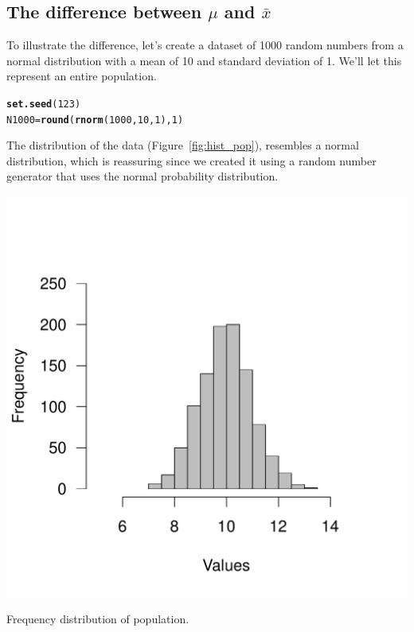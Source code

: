 \documentclass{tufte-handout}\usepackage[]{graphicx}\usepackage[]{color}
\makeatletter
\def\maxwidth{ %
  \ifdim\Gin@nat@width>\linewidth
    \linewidth
  \else
    \Gin@nat@width
  \fi
}
\newcommand{\hlnum}[1]{\textcolor[rgb]{0.686,0.059,0.569}{#1}}%
\newcommand{\hlstd}[1]{\textcolor[rgb]{0.345,0.345,0.345}{#1}}%
\newcommand{\hlkwb}[1]{\textcolor[rgb]{0.69,0.353,0.396}{#1}}%
\newcommand{\hlkwd}[1]{\textcolor[rgb]{0.737,0.353,0.396}{\textbf{#1}}}%
\newenvironment{kframe}{%
 \def\at@end@of@kframe{}%
 \ifinner\ifhmode%
  \def\at@end@of@kframe{\end{minipage}}%
  \begin{minipage}{\columnwidth}%
 \fi\fi%
 \def\FrameCommand##1{\hskip\@totalleftmargin \hskip-\fboxsep
 \colorbox{shadecolor}{##1}\hskip-\fboxsep
     \hskip-\linewidth \hskip-\@totalleftmargin \hskip\columnwidth}%
 \MakeFramed {\advance\hsize-\width
   \@totalleftmargin\z@ \linewidth\hsize
   \@setminipage}}%
 {\par\unskip\endMakeFramed%
 \at@end@of@kframe}
\newenvironment{knitrout}{}{} %
\makeatother
\begin{document}
\subsection{The difference between $\mu$ and $\bar{x}$}

To illustrate the difference, let's create a dataset of 1000 random numbers from a normal distribution with a mean of 10 and standard deviation of 1. We'll let this represent an entire population. 
\begin{knitrout}
\color{fgcolor}\begin{kframe}
\begin{alltt}
\hlkwd{set.seed}\hlstd{(}\hlnum{123}\hlstd{)}
\hlstd{N1000} \hlkwb{=} \hlkwd{round}\hlstd{(}\hlkwd{rnorm}\hlstd{(}\hlnum{1000}\hlstd{,} \hlnum{10}\hlstd{,} \hlnum{1}\hlstd{),} \hlnum{1}\hlstd{)}
\end{alltt}
\end{kframe}
\end{knitrout}

The distribution of the data (Figure~\ref{fig:hist_pop}), resembles a normal distribution, which is reassuring since we created it using a random number generator that uses the normal probability distribution. 

\begin{marginfigure}
\begin{knitrout}
\color{fgcolor}
\includegraphics[width=\maxwidth]{figure/unnamed-chunk-3-1} 

\end{knitrout}
\caption{Frequency distribution of population.}
\label{fig:hist_pop}
\end{marginfigure}
\end{document}
